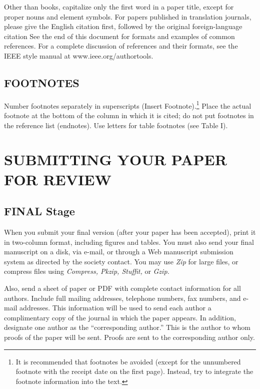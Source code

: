 \documentclass{IEEEoj}
\begin{document}
Other than books, capitalize only the first word in a paper title, except 
for proper nouns and element symbols. For papers published in translation 
journals, please give the English citation first, followed by the original 
foreign-language citation See the end of this document for formats and 
examples of common references. For a complete discussion of references and 
their formats, see the IEEE style manual at www.ieee.org/authortools.


\subsection{FOOTNOTES}
Number footnotes separately in superscripts (Insert\textbar 
Footnote).\footnote{It is recommended that footnotes be avoided (except for 
the unnumbered footnote with the receipt date on the first page). Instead, 
try to integrate the footnote information into the text.} Place the actual 
footnote at the bottom of the column in which it is cited; do not put 
footnotes in the reference list (endnotes). Use letters for table footnotes 
(see Table I). 

\section{SUBMITTING YOUR PAPER FOR REVIEW}

\subsection{FINAL Stage}
When you submit your final version (after your paper has been accepted), 
print it in two-column format, including figures and tables. You must also 
send your final manuscript on a disk, via e-mail, or through a Web 
manuscript submission system as directed by the society contact. You may use 
\textit{Zip} for large files, or compress files using \textit{Compress, Pkzip, Stuffit,} or \textit{Gzip.} 

Also, send a sheet of paper or PDF with complete contact information for all 
authors. Include full mailing addresses, telephone numbers, fax numbers, and 
e-mail addresses. This information will be used to send each author a 
complimentary copy of the journal in which the paper appears. In addition, 
designate one author as the ``corresponding author.'' This is the author to 
whom proofs of the paper will be sent. Proofs are sent to the corresponding 
author only.
\end{document}
